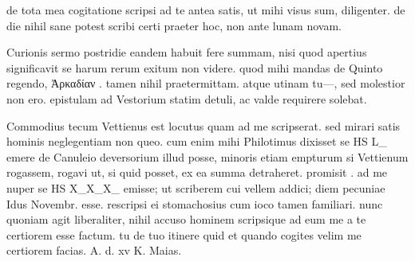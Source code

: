


 de tota mea cogitatione scripsi ad te antea satis, ut mihi visus sum, diligenter. de die nihil sane potest scribi certi praeter hoc, non ante lunam novam.

 Curionis sermo postridie eandem habuit fere summam, nisi quod apertius significavit se harum rerum exitum non videre. quod mihi mandas de Quinto regendo, Ἀρκαδίαν . tamen nihil praetermittam. atque utinam tu—, sed molestior non ero. epistulam ad Vestorium statim detuli, ac valde requirere solebat.

 Commodius tecum Vettienus est locutus quam ad me scripserat. sed mirari satis hominis neglegentiam non queo. cum enim mihi Philotimus dixisset se HS L_ emere de Canuleio deversorium illud posse, minoris etiam empturum si Vettienum rogassem, rogavi ut, si quid posset, ex ea summa detraheret. promisit . ad me nuper se HS X_X_X_ emisse; ut scriberem cui vellem addici; diem pecuniae Idus Novembr. esse. rescripsi ei stomachosius cum ioco tamen familiari. nunc quoniam agit liberaliter, nihil accuso hominem scripsique ad eum me a te certiorem esse factum. tu de tuo itinere quid et quando cogites velim me certiorem facias. A. d. xv K. Maias.
